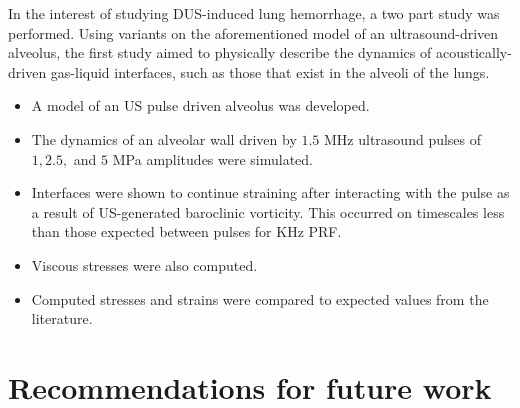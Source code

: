 In the interest of studying \ac{DUS}-induced lung hemorrhage, a two
part study was performed. Using variants on the aforementioned model
of an ultrasound-driven alveolus, the first study aimed to physically
describe the dynamics of acoustically-driven gas-liquid interfaces,
such as those that exist in the alveoli of the lungs.
\begin{itemize}
\item A model of an US pulse driven alveolus was developed.
\item The dynamics of an alveolar wall driven by $1.5$ MHz ultrasound
  pulses of $1, 2.5,$ and $5$ MPa amplitudes were simulated.
\item Interfaces were shown to continue straining after interacting
  with the pulse as a result of US-generated baroclinic vorticity. This
  occurred on timescales less than those expected between pulses for KHz
  PRF.
\item Viscous stresses were also computed.
\item Computed stresses and strains were compared to expected values
  from the literature.
\end{itemize}


\section{Recommendations for future work}